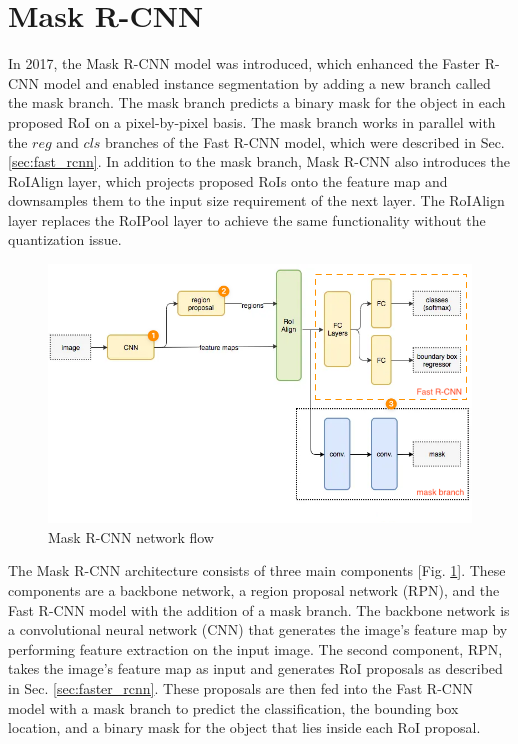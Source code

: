 \section{Mask R-CNN} \label{sec:mask_rcnn}

In 2017, the Mask R-CNN model was introduced, which enhanced the Faster R-CNN model and enabled instance segmentation by adding a new branch called the mask branch. The mask branch predicts a binary mask for the object in each proposed RoI on a pixel-by-pixel basis. The mask branch works in parallel with the $reg$ and $cls$ branches of the Fast R-CNN model, which were described in Sec. \ref{sec:fast_rcnn}. In addition to the mask branch, Mask R-CNN also introduces the RoIAlign layer, which projects proposed RoIs onto the feature map and downsamples them to the input size requirement of the next layer. The RoIAlign layer replaces the RoIPool layer to achieve the same functionality without the quantization issue.

\begin{figure}[!ht]
    \centering
    \includegraphics[width=5in]{figures/mask_rcnn_flowc.png}
    \caption{Mask R-CNN network flow \cite{rcnn_vari_flow_chart}} \label{fig:mask_rcnn_flowc}
\end{figure}

The Mask R-CNN architecture consists of three main components [Fig. \ref{fig:mask_rcnn_flowc}]. These components are a backbone network, a region proposal network (RPN), and the Fast R-CNN model with the addition of a mask branch. The backbone network is a convolutional neural network (CNN) that generates the image's feature map by performing feature extraction on the input image. The second component, RPN, takes the image's feature map as input and generates RoI proposals as described in Sec. \ref{sec:faster_rcnn}. These proposals are then fed into the Fast R-CNN model with a mask branch to predict the classification, the bounding box location, and a binary mask for the object that lies inside each RoI proposal. 

